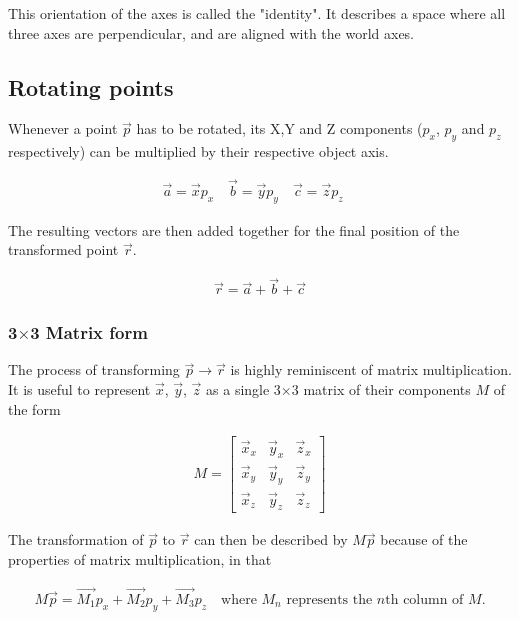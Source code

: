 \documentclass[12pt, a4paper]{article}
\begin{document}
This orientation of the axes is called the "identity". It describes a space
where all three axes are perpendicular, and are aligned with the world axes.

\subsection{Rotating points}
\label{rotating_points}

Whenever a point $\vec{p}$ has to be rotated, its X,Y and Z components ($p_x$,
$p_y$ and $p_z$ respectively) can be multiplied by their respective object axis.

\begin{align*}
    \vec{a} = \vec{x}p_x
    \quad
    \vec{b} = \vec{y}p_y
    \quad
    \vec{c} = \vec{z}p_z
    \quad
\end{align*}

The resulting vectors are then added together for the final position of
the transformed point $\vec{r}$.

\begin{align*}
    \vec{r} = \vec{a} + \vec{b} + \vec{c}
\end{align*}

\subsubsection{3$\times$3 Matrix form}
The process of transforming $\vec{p} \rightarrow \vec{r}$ is highly reminiscent of matrix
multiplication. It is useful to represent $\vec{x}$, $\vec{y}$, $\vec{z}$ as a
single 3$\times$3 matrix of their components $M$ of the form

\begin{align*}
    M = \begin{bmatrix}
            {\vec{x}}_x & {\vec{y}}_x & {\vec{z}}_x \\
            {\vec{x}}_y & {\vec{y}}_y & {\vec{z}}_y \\
            {\vec{x}}_z & {\vec{y}}_z & {\vec{z}}_z
        \end{bmatrix}
\end{align*}

The transformation of $\vec{p}$ to $\vec{r}$ can then be described by $M\vec{p}$
because of the properties of matrix multiplication, in that

\begin{align*}
    M\vec{p} = \vec{M_1}p_x + \vec{M_2}p_y + \vec{M_3}p_z
    \quad \text{where $M_n$ represents the $n$th column of $M$.}
\end{align*}
\end{document}
